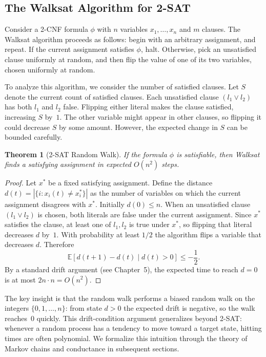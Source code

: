 \documentclass[twoside,12pt]{book}
\theoremstyle{plain}
\newtheorem{theorem}{Theorem}[chapter]
\theoremstyle{definition}
\theoremstyle{remark}
\newenvironment{cpplisting}{\begin{center}\small}{\end{center}}
\begin{document}
\subsection{The Walksat Algorithm for 2-SAT}

Consider a 2-CNF formula $\phi$ with $n$ variables $x_1, \ldots, x_n$
and $m$ clauses. The Walksat algorithm proceeds as follows: begin with an
arbitrary assignment, and repeat. If the current assignment satisfies
$\phi$, halt. Otherwise, pick an unsatisfied clause uniformly at random,
and then flip the value of one of its two variables, chosen uniformly at
random.

To analyze this algorithm, we consider the number of satisfied clauses.
Let $S$ denote the current count of satisfied clauses. Each unsatisfied
clause $(l_1 \vee l_2)$ has both $l_1$ and $l_2$ false. Flipping either
literal makes the clause satisfied, increasing $S$ by~$1$. The other
variable might appear in other clauses, so flipping it could decrease $S$
by some amount. However, the expected change in $S$ can be bounded
carefully.

\begin{theorem}[2-SAT Random Walk]\label{thm:2sat-walk}
If the formula $\phi$ is satisfiable, then Walksat finds a satisfying
assignment in expected $O(n^2)$ steps.
\end{theorem}

\begin{proof}
Let $x^*$ be a fixed satisfying assignment. Define the distance
$d(t) = |\{i : x_i(t) \neq x_i^*\}|$ as the number of variables on which
the current assignment disagrees with $x^*$. Initially $d(0) \leq n$.
When an unsatisfied clause $(l_1 \vee l_2)$ is chosen, both literals are
false under the current assignment. Since $x^*$ satisfies the clause, at
least one of $l_1, l_2$ is true under $x^*$, so flipping that literal
decreases $d$ by~$1$. With probability at least $1/2$ the algorithm flips
a variable that decreases $d$. Therefore
\[
    \mathbb{E}[d(t+1) - d(t) \mid d(t) > 0] \leq -\frac{1}{2}.
\]
By a standard drift argument (see Chapter~5), the expected time to reach
$d = 0$ is at most $2n \cdot n = O(n^2)$.
\end{proof}

\begin{cpplisting}

\end{cpplisting}

The key insight is that the random walk performs a biased random walk on
the integers $\{0, 1, \ldots, n\}$: from state $d > 0$ the expected drift
is negative, so the walk reaches~$0$ quickly. This
drift-condition argument generalizes beyond 2-SAT: whenever a random
process has a tendency to move toward a target state, hitting times are
often polynomial. We formalize this intuition through the theory of
Markov chains and conductance in subsequent sections.
\end{document}
